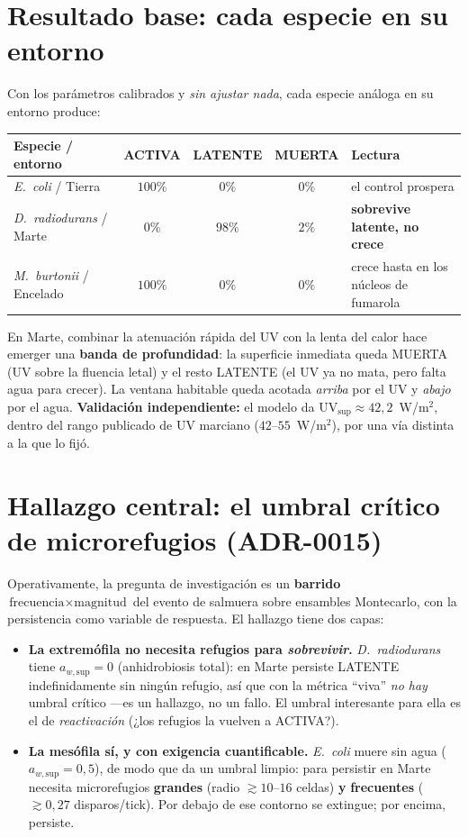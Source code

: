 \documentclass[11pt]{article}
\newcommand{\MUERTA}{\textcolor{acmuerta}{\textsf{MUERTA}}}
\newcommand{\LATENTE}{\textcolor{aclatente}{\textsf{LATENTE}}}
\newcommand{\ACTIVA}{\textcolor{acactiva}{\textsf{ACTIVA}}}
\begin{document}
\section{Resultado base: cada especie en su entorno}

Con los parámetros calibrados y \emph{sin ajustar nada}, cada especie análoga en su
entorno produce:

\begin{center}\small
\begin{tabular}{@{}lcccl@{}}
\toprule
Especie / entorno & \ACTIVA & \LATENTE & \MUERTA & Lectura \\
\midrule
\emph{E.\ coli} / Tierra & $100\%$ & $0\%$ & $0\%$ & el control prospera \\
\emph{D.\ radiodurans} / Marte & $0\%$ & $98\%$ & $2\%$ & \textbf{sobrevive latente, no crece} \\
\emph{M.\ burtonii} / Encelado & $100\%$ & $0\%$ & $0\%$ & crece hasta en los núcleos de fumarola \\
\bottomrule
\end{tabular}
\end{center}

En Marte, combinar la atenuación rápida del UV con la lenta del calor hace emerger
una \textbf{banda de profundidad}: la superficie inmediata queda \MUERTA{} (UV
sobre la fluencia letal) y el resto \LATENTE{} (el UV ya no mata, pero falta agua
para crecer). La ventana habitable queda acotada \emph{arriba} por el UV y
\emph{abajo} por el agua. \textbf{Validación independiente:} el modelo da
$\mathrm{UV}_{\mathrm{sup}}\approx 42{,}2$~W/m$^2$, dentro del rango publicado de UV
marciano ($42$--$55$~W/m$^2$), por una vía distinta a la que lo fijó.

\section{Hallazgo central: el umbral crítico de microrefugios (ADR-0015)}

Operativamente, la pregunta de investigación es un \textbf{barrido}
$\text{frecuencia}\times\text{magnitud}$ del evento de salmuera sobre ensambles
Montecarlo, con la persistencia como variable de respuesta. El hallazgo tiene dos
capas:

\begin{itemize}[nosep]
  \item \textbf{La extremófila no necesita refugios para \emph{sobrevivir}.}
  \emph{D.\ radiodurans} tiene $a_{w,\text{sup}}=0$ (anhidrobiosis total): en Marte
  persiste \LATENTE{} indefinidamente sin ningún refugio, así que con la métrica
  ``viva'' \emph{no hay} umbral crítico —es un hallazgo, no un fallo. El umbral
  interesante para ella es el de \emph{reactivación} (¿los refugios la vuelven a
  \ACTIVA?).
  \item \textbf{La mesófila sí, y con exigencia cuantificable.} \emph{E.\ coli}
  muere sin agua ($a_{w,\text{sup}}=0{,}5$), de modo que da un umbral limpio: para
  persistir en Marte necesita microrefugios \textbf{grandes} (radio $\gtrsim 10$--$16$
  celdas) \textbf{y} \textbf{frecuentes} ($\gtrsim 0{,}27$ disparos/tick). Por debajo
  de ese contorno se extingue; por encima, persiste.
\end{itemize}
\end{document}
